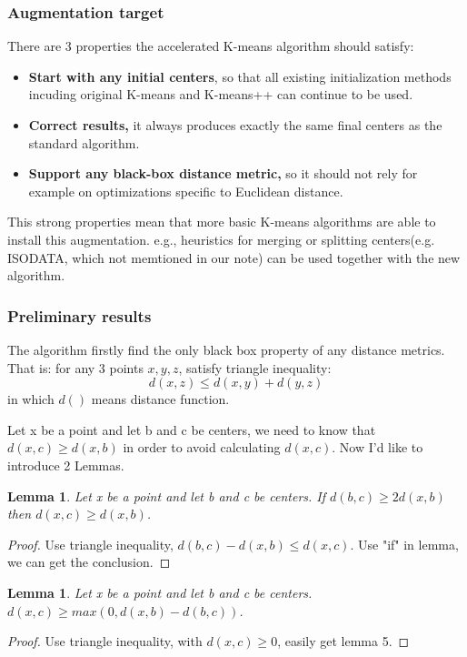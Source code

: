 \documentclass[11pt]{article}
\newtheorem{lemma}[theorem]{Lemma}
\begin{document}
\subsubsection{Augmentation target}
There are 3 properties the accelerated K-means algorithm should satisfy:
\begin{itemize}
\item \textbf{Start with any initial centers}, so that all existing initialization methods incuding original K-means and K-means++ can continue to be used.
\item \textbf{Correct results, } it always produces exactly the same final centers as the standard  algorithm.
\item \textbf{Support any black-box distance metric,} so it should not rely for example on optimizations specific to Euclidean distance.
\end{itemize} \par
This strong properties mean that more basic K-means algorithms are able to install this augmentation. e.g., heuristics for merging or splitting centers(e.g. ISODATA, which not memtioned in our note) can be used together with the new algorithm.

\subsubsection{Preliminary results}
The algorithm firstly find the only black box property of any distance metrics. That is: for any 3 points $x, y, z$, satisfy  triangle inequality:
$$d(x,z) \le d(x, y) + d(y, z)$$ in which $d()$ means distance function.\par
Let x be a point and let b and c be centers, we need to know that $d(x, c) \ge d(x, b)$ in order to avoid calculating $d(x, c)$. Now I'd like to introduce 2 Lemmas.
\begin{lemma}
Let x be a point and let b and c be centers. If $d(b, c) \ge 2d(x,b)$ then $d(x,c) \ge d(x,b)$.
\end{lemma}
\begin{proof}
Use  triangle inequality, $d(b,c) - d(x,b)\le d(x,c)$. Use "if" in lemma, we can get the conclusion.
\end{proof}
\begin{lemma}
Let x be a point and let b and c be centers.$d(x,c) \ge max(0, d(x,b)-d(b,c))$.
\end{lemma}
\begin{proof}
Use triangle inequality, with $d(x,c) \ge 0$, easily get lemma 5.
\end{proof}
\end{document}
